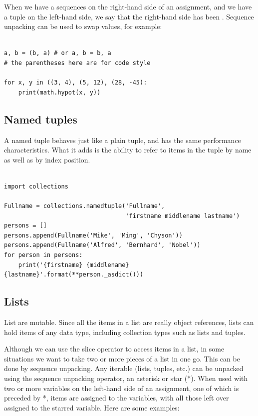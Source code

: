 When we have a sequences on the right-hand side of an assignment, and
we have a tuple on the left-hand side,
we say that the right-hand side has been .
Sequence unpacking can be used to swap values, for example:
\begin{lstlisting}

a, b = (b, a) # or a, b = b, a
# the parentheses here are for code style

for x, y in ((3, 4), (5, 12), (28, -45):
    print(math.hypot(x, y))
\end{lstlisting}



\subsection{Named tuples}


A named tuple behaves just like a plain tuple, and has the same performance characteristics.
What it adds is the ability to refer to items in the tuple by name as well as by index position.


\begin{lstlisting}

import collections

Fullname = collections.namedtuple('Fullname',
                                  'firstname middlename lastname')
persons = []
persons.append(Fullname('Mike', 'Ming', 'Chyson'))
persons.append(Fullname('Alfred', 'Bernhard', 'Nobel'))
for person in persons:
    print('{firstname} {middlename} {lastname}'.format(**person._asdict()))

\end{lstlisting}



\subsection{Lists}

List are mutable.
Since all the items in a list are really object references, lists can hold items of any data type, including collection types such as lists and tuples.


Although we can use the slice operator to access items in a list, in some situations we want to take two or more pieces of a list in one go.
This can be done by sequence unpacking.
Any iterable (lists, tuples, etc.) can be unpacked using the sequence unpacking operator, an asterisk or star (*).
When used with two or more variables on the left-hand side of an assignment, one of which is preceded by *, items are assigned to the variables, with all those left over assigned to the starred variable.
Here are some examples:

